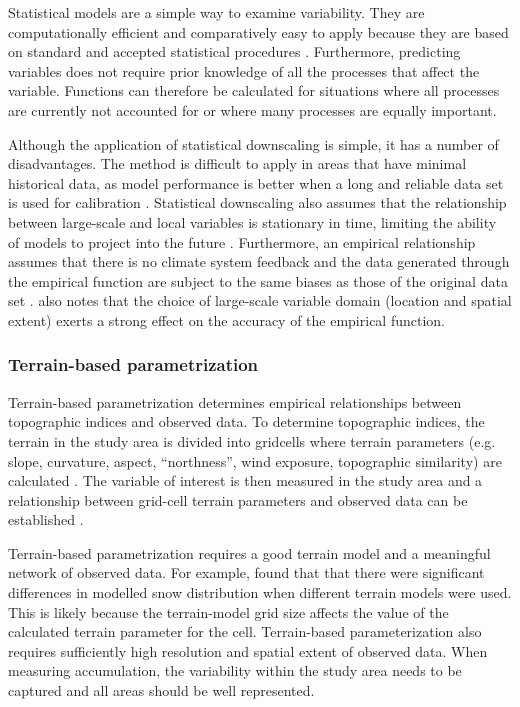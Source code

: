 \documentclass{sfuthesis}
\begin{document}
Statistical models are a simple way to examine variability. They are computationally efficient and comparatively easy to apply because they are based on standard and accepted statistical procedures \citep{Fowler2007}. Furthermore, predicting variables does not require prior knowledge of all the processes that affect the variable. Functions can therefore be calculated for situations where all processes are currently not accounted for or where many processes are equally important. 

Although the application of statistical downscaling is simple, it has a number of disadvantages. The method is difficult to apply in areas that have minimal historical data, as model performance is better when a long and reliable data set is used for calibration \citep{Fowler2007}. Statistical downscaling also assumes that the relationship between large-scale and local variables is stationary in time, limiting the ability of models to project into the future \citep{Fowler2007}. Furthermore, an empirical relationship assumes that there is no climate system feedback and the data generated through the empirical function are subject to the same biases as those of the original data set \citep{Fowler2007}. \cite{Wilby2000} also notes that the choice of large-scale variable domain (location and spatial extent) exerts a strong effect on the accuracy of the empirical function.

\subsubsection{Terrain-based parametrization}
Terrain-based parametrization determines empirical relationships between topographic indices and observed data. To determine topographic indices, the terrain in the study area is divided into gridcells where terrain parameters (e.g. slope, curvature, aspect, ``northness'', wind exposure, topographic similarity) are calculated \citep{Anderson2014,McGrath2015}. The variable of interest is then measured in the study area and a relationship between grid-cell terrain parameters and observed data can be established \citep[e.g.][]{Bloschl1991, Liston1998, Anderton2004,McGrath2015}. 

Terrain-based parametrization requires a good terrain model and a meaningful network of observed data. For example, \cite{Molotch2005} found that that there were significant differences in modelled snow distribution when different terrain models were used. This is likely because the terrain-model grid size affects the value of the calculated terrain parameter for the cell. Terrain-based parameterization also requires sufficiently high resolution and spatial extent of observed data. When measuring accumulation, the variability within the study area needs to be captured and all areas should be well represented. 
\end{document}
